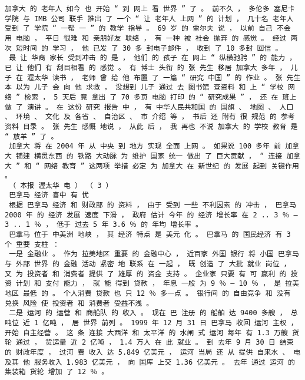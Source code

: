 \documentclass{article}
\begin{document}
\begin{Verbatim}[commandchars=\\\{\}]
 加拿大 的 老年人 如今 也 开始 “ 到 网上 看 世界 ” 了 。 前不久 ， 多伦多 塞尼卡 学院 与 IMB 公司 联手 推出 了 一个 “ 让 老年人 上网 ” 的 计划 ， 几十名 老年人 受到 了 学院 “ 一帮 一 ” 的 教学 指导 。 69 岁 的 雷尔夫 说 ， 以前 自己 不会 用 电脑 ， 平日 很难 和 亲朋好友 联络 ， 有 一种 被 社会 抛弃 的 感觉 。 经过 两次 短时间 的 学习 ， 他 已发 了 30 多 封电子邮件 ， 收到 了 10 多封 回信 。 
 最 让 华裔 家长 受到冲击 的 是 ， 他们 的 孩子 在 网上 “ 纵横驰骋 ” 的 能力 ， 已 让 他们 有 刮目相看 的 感觉 。 有 博士 头衔 的 张 先生 移居 加拿大 多年 ， 儿子 在 渥太华 读书 ， 老师 曾 给 他 布置 了 一篇 “ 研究 中国 ” 的 作业 。 张 先生 本 以为 儿子 会 向 他 求救 ， 没想到 儿子 通过 去 图书馆 查资料 和 上 “ 学校 网络 ” 检索 ， 5 天后 竟 拿出 了 70 多页 电脑 打印 的 “ 研究成果 ” ， 还 在 班上 做 了 演讲 。 在 这份 研究 报告 中 ， 有 中华人民共和国 的 国旗 、 地图 、 人口 、 环境 、 文化 及 各省 、 自治区 、 市 介绍 等 ， 书后 还 附有 很 规范 的 参考资料 目录 。 张 先生 感慨 地说 ， 从此 后 ， 我 再也 不说 加拿大 的 学校 教育 是 “ 放羊 ” 了 。 
 加拿大 将 在 2004 年 从 中央 到 地方 实现 全面 上网 。 如果说 100 多年 前 加拿大 铺建 横贯东西 的 铁路 大动脉 为 维护 国家 统一 做出 了 巨大贡献 ， “ 连接 加拿大 ” 和 “ 网络 教育 ” 这两项 举措 必定 为 加拿大 在 新世纪 的 发展 起到 关键作用 。 
 （ 本报 渥太华 电 ） （ 3 ） 
 巴拿马 经济 喜中 有 忧 
 根据 巴拿马 经济 和 财政部 的 资料 ， 由于 受到 一些 不利因素 的 冲击 ， 巴拿马 2000 年 的 经济 发展 速度 下滑 ， 政府 估计 今年 的 经济 增长率 在 2 .. 3 ％ — 3 .. 1 ％ ， 低于 过去 5 年 3.6 ％ 的 年均 增长率 。 
 巴拿马 位于 中美洲 地峡 ， 其 经济 特点 是 美元 化 。 巴拿马 的 国民经济 有 3 个 重要 支柱 ： 
 一是 金融业 。 作为 拉美地区 重要 的 金融中心 ， 近百家 外国 银行 将 小国 巴拿马 与 外部 世界 的 金融 活动 紧密 地 联系 在 一起 ， 既 创造 了 大批 就业 岗位 ， 又 为 投资者 和 消费者 提供 了 雄厚 的 资金 支持 。 企业家 只要 有 可 赢利 的 投资 计划 和 支付 能力 ， 就 能 得到 贷款 ， 年息 一般 为 9 ％ — 10 ％ ， 是 拉美地区 最低 的 。 个人消费 贷款 也 只 12 ％ 多一点 。 银行间 的 自由竞争 和 没有 兑换 风险 使 投资者 和 消费者 受益不浅 。 
 二是 运河 的 运营 和 商船队 的 收入 。 现在 巴 注册 的 船舶 达 9400 多艘 ， 总吨位 近 1 亿吨 ， 居 世界 前列 。 1999 年 12 月 31 日 巴拿马 收回 运河 主权 ， 开始 自主经营 。 这 条 连接 大西洋 和 太平洋 的 水闸 式 运河 每年 有 1.3 万艘 货轮 通过 ， 货运量 近 2 亿吨 ， 1.4 万人 在 此 就业 。 到 去年 9 月 30 日 结束 的 财政年度 ， 过河 费 收入 达 5.849 亿美元 ， 运河 当局 还 从 提供 自来水 、 电 及其 他 服务收入 1.983 亿美元 ， 向 国库 上交 1.36 亿美元 。 去年 通过 运河 的 集装箱 货轮 增加 了 12 ％ 。 

\end{Verbatim}
\end{document}
